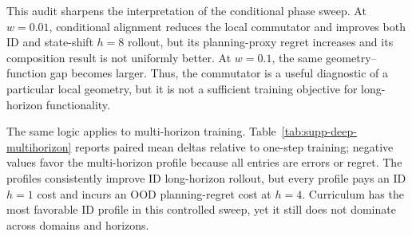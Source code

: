 \documentclass{article}
\begin{document}
\begin{table}[H]
\centering
\scriptsize
\setlength{\tabcolsep}{3pt}
\caption{Strict joint-success audit across alignment and equivariance
interventions. The factorial vector-world rows use predictor-equivariance and
operator-alignment diagnostics together with one-step error, $h=8$ rollout,
and action composition. The checkpoint-matched nonlinear rows additionally
include state-shift composition and the shared-candidate planning proxy. A
``geometry-only'' label is not a performance claim.}
\label{tab:supp-deep-claim-matrix}
\end{table}

This audit sharpens the interpretation of the conditional phase sweep. At
$w=0.01$, conditional alignment reduces the local commutator and improves
both ID and state-shift $h=8$ rollout, but its planning-proxy regret increases
and its composition result is not uniformly better. At $w=0.1$, the same
geometry--function gap becomes larger. Thus, the commutator is a useful
diagnostic of a particular local geometry, but it is not a sufficient training
objective for long-horizon functionality.

The same logic applies to multi-horizon training. Table~\ref{tab:supp-deep-multihorizon}
reports paired mean deltas relative to one-step training; negative values favor
the multi-horizon profile because all entries are errors or regret. The
profiles consistently improve ID long-horizon rollout, but every profile pays
an ID $h=1$ cost and incurs an OOD planning-regret cost at $h=4$. Curriculum
has the most favorable ID profile in this controlled sweep, yet it still does
not dominate across domains and horizons.
\end{document}
